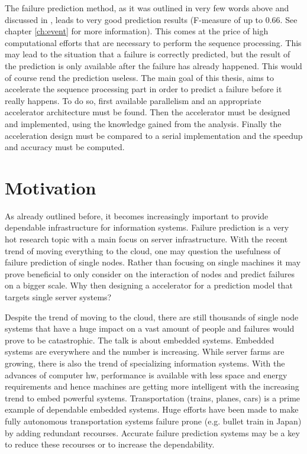 \documentclass[mscthesis]{usiinfthesis}
\begin{document}
The failure prediction method, as it was outlined in very few words above and
discussed in \cite{salfner08}, leads to very good prediction results (F-measure
of up to 0.66. See chapter \ref{ch:event} for more information). This comes at
the price of high computational efforts that are necessary to perform the
sequence processing. This may lead to the situation that a failure is correctly
predicted, but the result of the prediction is only available after the failure
has already happened. This would of course rend the prediction useless. The
main goal of this thesis, aims to accelerate the sequence processing part in
order to predict a failure before it really happens. To do so, first available
parallelism and an appropriate accelerator architecture must be found. Then the
accelerator must be designed and implemented, using the knowledge gained from
the analysis. Finally the acceleration design must be compared to a serial
implementation and the speedup and accuracy must be computed.

\section{Motivation}
\label{ch:intro_mot}

As already outlined before, it becomes increasingly important to provide
dependable infrastructure for information systems. Failure prediction is a very
hot research topic with a main focus on server infrastructure. With the recent
trend of moving everything to the cloud, one may question the usefulness of
failure prediction of single nodes. Rather than focusing on single machines it
may prove beneficial to only consider on the interaction of nodes and predict
failures on a bigger scale. Why then designing a accelerator for a prediction
model that targets single server systems?

Despite the trend of moving to the cloud, there are still thousands of single
node systems that have a huge impact on a vast amount of people and failures
would prove to be catastrophic. The talk is about embedded systems. Embedded
systems are everywhere and the number is increasing. While server farms are
growing, there is also the trend of specializing information systems. With the
advances of computer \gls{hw}, performance is available with less space and
energy requirements and hence machines are getting more intelligent with the
increasing trend to embed powerful systems. Transportation (trains, planes,
cars) is a prime example of dependable embedded systems. Huge efforts have been
made to make fully autonomous transportation systems failure prone (e.g. bullet
train in Japan) by adding redundant recourses. Accurate failure prediction
systems may be a key to reduce these recourses or to increase the
dependability.
\end{document}
